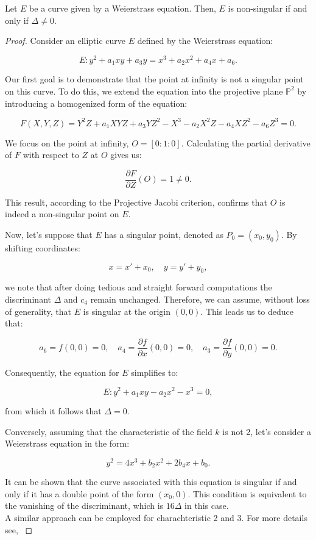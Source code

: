 \begin{proposition}
Let $E$ be a curve given by a Weierstrass equation. Then, \newline
$E$ is non-singular if and only if \textbf{$\Delta \neq 0$}.

\newline
\begin{proof} 

Consider an elliptic curve \( E \) defined by the Weierstrass equation:

\[
E: y^2 + a_1xy + a_3y = x^3 + a_2x^2 + a_4x + a_6.
\]

Our first goal is to demonstrate that the point at infinity is not a singular point on this curve. To do this, we extend the equation into the projective plane \( \mathbb{P}^2 \) by introducing a homogenized form of the equation:

\[
F(X, Y, Z) = Y^2Z + a_1XYZ + a_3YZ^2 - X^3 - a_2X^2Z - a_4XZ^2 - a_6Z^3 = 0.
\]

We focus on the point at infinity, \( O = [0:1:0] \). Calculating the partial derivative of \( F \) with respect to \( Z \) at \( O \) gives us:

\[
\frac{\partial F}{\partial Z}(O) = 1 \neq 0.
\]

This result, according to the Projective Jacobi criterion, confirms that \( O \) is indeed a non-singular point on \( E \).

Now, let's suppose that \( E \) has a singular point, denoted as \( P_0 = (x_0, y_0) \). By shifting coordinates:

\[
x = x' + x_0, \quad y = y' + y_0,
\]

we note that after doing tedious and straight forward computations the discriminant \( \Delta \) and \( c_4 \) remain unchanged. Therefore, we can assume, without loss of generality, that \( E \) is singular at the origin \( (0,0) \). This leads us to deduce that:

\[
a_6 = f(0,0) = 0, \quad a_4 = \frac{\partial f}{\partial x}(0,0) = 0, \quad a_3 = \frac{\partial f}{\partial y}(0,0) = 0.
\]

Consequently, the equation for \( E \) simplifies to:

\[
E: y^2 + a_1xy - a_2x^2 - x^3 = 0,
\]

from which it follows that \( \Delta = 0 \).

Conversely, assuming that the characteristic of the field \( k \) is not 2, let's consider a Weierstrass equation in the form:

\[
y^2 = 4x^3 + b_2x^2 + 2b_4x + b_0.
\]

It can be shown that the curve associated with this equation is singular if and only if it has a double point of the form \( (x_0, 0) \). This condition is equivalent to the vanishing of the discriminant, which is \( 16\Delta \) in this case.
\\
A similar approach can be employed for charachteristic 2 and 3. For more details see, \cite{silv}
\end{proof}
\end{proposition} 
 
